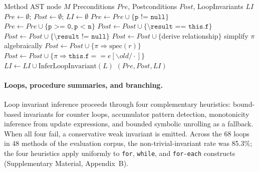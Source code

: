 \begin{algorithm}[t]
\caption{Specification Inference via Pattern Matching}
\label{alg:inference}
\begin{algorithmic}[1]
\REQUIRE Method AST node $M$
\ENSURE Preconditions $Pre$, Postconditions $Post$, LoopInvariants $LI$
\STATE $Pre \gets \emptyset$; $Post \gets \emptyset$; $LI \gets \emptyset$
\STATE {}
        \STATE $Pre \gets Pre \cup \{\texttt{p != null}\}$
        \STATE $Pre \gets Pre \cup \{\texttt{p >= 0}, \texttt{p < n}\}$
    \ENDIF
\ENDFOR
\STATE {}
        \STATE $Post \gets Post \cup \{\texttt{\textbackslash result == this.f}\}$
        \STATE $Post \gets Post \cup \{\texttt{\textbackslash result != null}\}$
        \STATE $Post \gets Post \cup \{$derive relationship$\}$
    \ENDIF
\ENDFOR
\STATE {}
    \STATE simplify $\pi$ algebraically
    \STATE $Post \gets Post \cup \{\pi \Longrightarrow \text{spec}(r)\}$
\ENDFOR
{}
    \STATE $Post \gets Post \cup \{\pi \Longrightarrow \mathtt{this.f} == e[\backslash\mathit{old}/\cdot]\}$
\ENDFOR
\STATE {}
    \STATE $LI \gets LI \cup \text{InferLoopInvariant}(L)$
\ENDFOR
\RETURN $(Pre, Post, LI)$
\end{algorithmic}
\end{algorithm}

\paragraph{Loops, procedure summaries, and branching.}
Loop invariant inference proceeds through four complementary heuristics: bound-based invariants for counter loops, accumulator pattern detection, monotonicity inference from update expressions, and bounded symbolic unrolling as a fallback. When all four fail, a conservative weak invariant is emitted. Across the 68 loops in 48 methods of the evaluation corpus, the non-trivial-invariant rate was 85.3\%; the four heuristics apply uniformly to \texttt{for}, \texttt{while}, and \texttt{for-each} constructs (Supplementary Material, Appendix~B).

